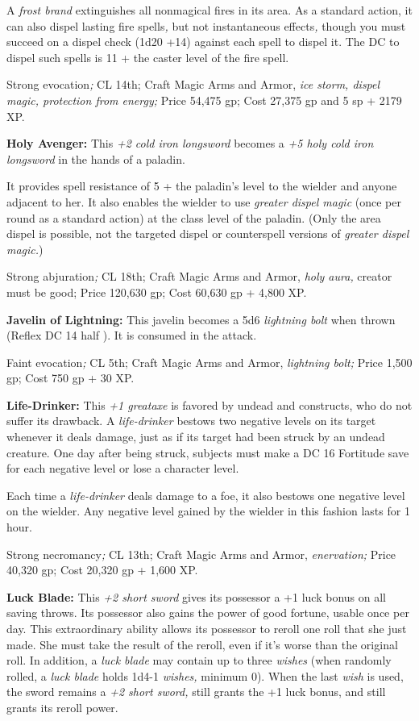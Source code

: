 A \textit{frost brand }extinguishes all nonmagical fires in its area. As a standard 
action, it can also dispel lasting fire spells\textit{, }but not instantaneous 
effects\textit{, }though you must succeed on a dispel check (1d20 +14) against 
each spell to dispel it. The DC to dispel such spells is 11 + the caster level 
of the fire spell.

Strong evocation\textit{; }CL 14th; Craft Magic Arms and Armor, \textit{ice storm, 
dispel magic, protection from energy; }Price 54,475 gp; Cost 27,375 gp and 5 sp 
+ 2179 XP.

\textbf{Holy Avenger: }This \textit{+2 cold iron longsword }becomes a \textit{+5 
holy cold iron longsword }in the hands of a paladin.

It provides spell resistance of 5 + the paladin's level to the wielder and anyone 
adjacent to her. It also enables the wielder to use \textit{greater dispel magic 
}(once per round as a standard action) at the class level of the paladin. (Only 
the area dispel is possible, not the targeted dispel or counterspell versions of 
\textit{greater dispel magic.})

Strong abjuration\textit{; }CL 18th; Craft Magic Arms and Armor, \textit{holy aura, 
}creator must be good; Price 120,630 gp; Cost 60,630 gp + 4,800 XP.

\textbf{Javelin of Lightning: }This javelin becomes a 5d6 \textit{lightning bolt 
}when thrown (Reflex DC 14 half ). It is consumed in the attack.

Faint evocation\textit{; }CL 5th; Craft Magic Arms and Armor, \textit{lightning 
bolt; }Price 1,500 gp; Cost 750 gp + 30 XP.

\textbf{Life-Drinker:} This \textit{+1 greataxe }is favored by undead and constructs, 
who do not suffer its drawback. A \textit{life-drinker }bestows two negative levels 
on its target whenever it deals damage, just as if its target had been struck by 
an undead creature. One day after being struck, subjects must make a DC 16 Fortitude 
save for each negative level or lose a character level.

Each time a \textit{life-drinker }deals damage to a foe, it also bestows one negative 
level on the wielder. Any negative level gained by the wielder in this fashion 
lasts for 1 hour.

Strong necromancy\textit{; }CL 13th; Craft Magic Arms and Armor, \textit{enervation; 
}Price 40,320 gp; Cost 20,320 gp + 1,600 XP.

\textbf{Luck Blade: }This \textit{+2 short sword }gives its possessor a +1 luck 
bonus on all saving throws. Its possessor also gains the power of good fortune, 
usable once per day. This extraordinary ability allows its possessor to reroll 
one roll that she just made. She must take the result of the reroll, even if it's 
worse than the original roll. In addition, a \textit{luck blade }may contain up 
to three \textit{wishes }(when randomly rolled, a \textit{luck blade }holds 1d4-1 
\textit{wishes, }minimum 0). When the last \textit{wish }is used, the sword remains 
a \textit{+2 short sword, }still grants the +1 luck bonus, and still grants its 
reroll power.

